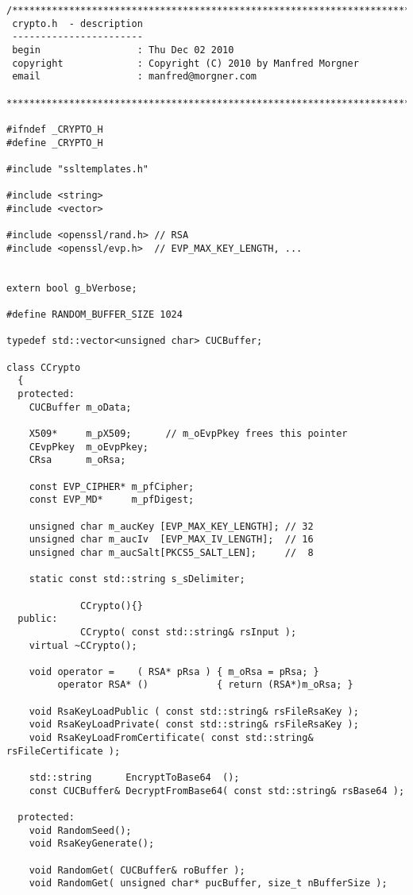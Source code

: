 \documentclass[twoside,a4paper,english,12pt,authoryear,openright]{book}
\begin{document}
\begin{lstlisting}
/***************************************************************************
 crypto.h  - description
 -----------------------
 begin                 : Thu Dec 02 2010
 copyright             : Copyright (C) 2010 by Manfred Morgner
 email                 : manfred@morgner.com
 ***************************************************************************/
 
#ifndef _CRYPTO_H
#define _CRYPTO_H

#include "ssltemplates.h"

#include <string>
#include <vector>

#include <openssl/rand.h> // RSA
#include <openssl/evp.h>  // EVP_MAX_KEY_LENGTH, ...


extern bool g_bVerbose;

#define RANDOM_BUFFER_SIZE 1024

typedef std::vector<unsigned char> CUCBuffer;

class CCrypto
  {
  protected:
    CUCBuffer m_oData;

    X509*     m_pX509;      // m_oEvpPkey frees this pointer
    CEvpPkey  m_oEvpPkey;
    CRsa      m_oRsa;

    const EVP_CIPHER* m_pfCipher;
    const EVP_MD*     m_pfDigest;

    unsigned char m_aucKey [EVP_MAX_KEY_LENGTH]; // 32
    unsigned char m_aucIv  [EVP_MAX_IV_LENGTH];  // 16
    unsigned char m_aucSalt[PKCS5_SALT_LEN];     //  8

    static const std::string s_sDelimiter;

             CCrypto(){}
  public:
             CCrypto( const std::string& rsInput );
    virtual ~CCrypto();

    void operator =    ( RSA* pRsa ) { m_oRsa = pRsa; }
         operator RSA* ()            { return (RSA*)m_oRsa; }

    void RsaKeyLoadPublic ( const std::string& rsFileRsaKey );
    void RsaKeyLoadPrivate( const std::string& rsFileRsaKey );
    void RsaKeyLoadFromCertificate( const std::string& rsFileCertificate );

    std::string      EncryptToBase64  ();
    const CUCBuffer& DecryptFromBase64( const std::string& rsBase64 );

  protected:
    void RandomSeed();
    void RsaKeyGenerate();

    void RandomGet( CUCBuffer& roBuffer );
    void RandomGet( unsigned char* pucBuffer, size_t nBufferSize );


\end{lstlisting}
\end{document}
